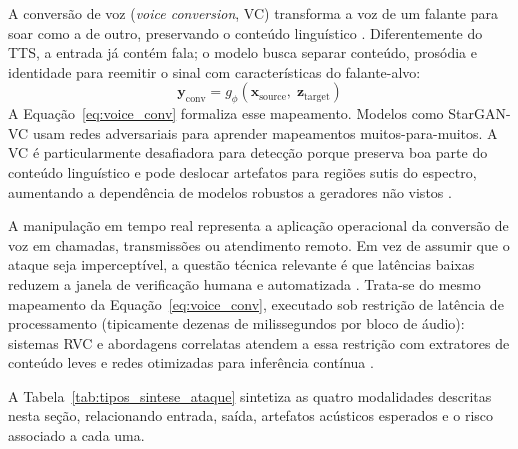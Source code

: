 \documentclass[12pt,a4paper]{article}
\begin{document}
A conversão de voz (\textit{voice conversion}, VC) transforma a voz de um
falante para soar como a de outro, preservando o conteúdo linguístico
\cite{bird2023realtime}. Diferentemente do TTS, a entrada já contém fala; o
modelo busca separar conteúdo, prosódia e identidade para reemitir o sinal com
características do falante-alvo:
\begin{equation}
\label{eq:voice_conv}
\mathbf{y}_{\mathrm{conv}} = g_{\phi}(\mathbf{x}_{\mathrm{source}},\; \mathbf{z}_{\mathrm{target}})
\end{equation}
A Equação~\ref{eq:voice_conv} formaliza esse mapeamento. Modelos como
StarGAN-VC \cite{kameoka2018stargan} usam redes adversariais para aprender
mapeamentos muitos-para-muitos. A VC é particularmente desafiadora para
detecção porque preserva boa parte do conteúdo linguístico e pode deslocar
artefatos para regiões sutis do espectro, aumentando a dependência de modelos
robustos a geradores não vistos \cite{wang2024asvspoof5}.

A manipulação em tempo real representa a aplicação operacional da conversão de
voz em chamadas, transmissões ou atendimento remoto. Em vez de assumir que o
ataque seja imperceptível, a questão técnica relevante é que latências baixas
reduzem a janela de verificação humana e automatizada \cite{pindrop2025}.
Trata-se do mesmo mapeamento da Equação~\ref{eq:voice_conv}, executado sob
restrição de latência de processamento (tipicamente dezenas de milissegundos
por bloco de áudio): sistemas RVC e abordagens correlatas atendem a essa
restrição com extratores de conteúdo leves e redes otimizadas para inferência
contínua \cite{bird2023realtime}.

A Tabela~\ref{tab:tipos_sintese_ataque} sintetiza as quatro modalidades
descritas nesta seção, relacionando entrada, saída, artefatos acústicos
esperados e o risco associado a cada uma.
\end{document}
